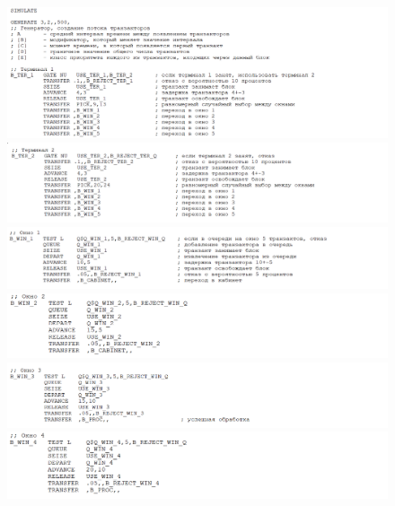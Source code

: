 \begin{figure}[H]
    \centering
    \includegraphics[width=1\textwidth]{img/content/code_1.png}
    \includegraphics[width=1\textwidth]{img/content/code_2.png}
    \includegraphics[width=1\textwidth]{img/content/code_3.png}
    \includegraphics[width=1\textwidth]{img/content/code_4.png}
    \includegraphics[width=1\textwidth]{img/content/code_5.png}
    \includegraphics[width=1\textwidth]{img/content/code_6.png}
\end{figure}

